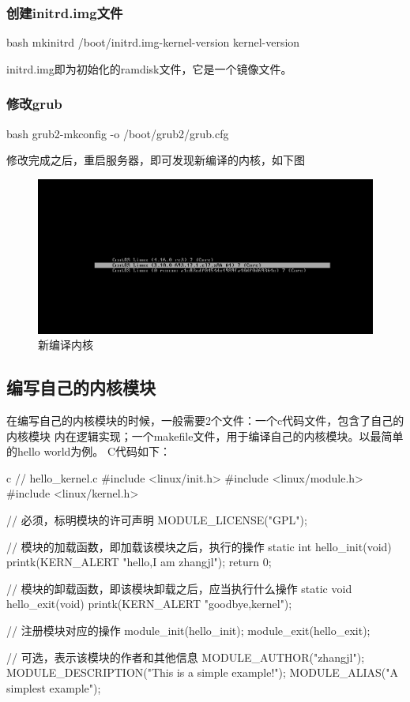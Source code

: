 \subsubsection{创建initrd.img文件}
\begin{code-block}{bash}
mkinitrd  /boot/initrd.img-{kernel-version} {kernel-version}
\end{code-block}

initrd.img即为初始化的ramdisk文件，它是一个镜像文件。

\subsubsection{修改grub}
\begin{code-block}{bash}
grub2-mkconfig -o /boot/grub2/grub.cfg
\end{code-block}

修改完成之后，重启服务器，即可发现新编译的内核，如下图
\begin{figure}[H]
  \centering
  \includegraphics[scale=0.2]{new-kernel.png}
  \caption{新编译内核}
  \label{fig:new-kernel}
\end{figure}

\subsection{编写自己的内核模块}
在编写自己的内核模块的时候，一般需要2个文件：一个c代码文件，包含了自己的内核模块
内在逻辑实现；一个makefile文件，用于编译自己的内核模块。以最简单的hello world为例。
C代码如下：
\begin{code-block}{c}
// hello_kernel.c
#include <linux/init.h>
#include <linux/module.h>
#include <linux/kernel.h>

// 必须，标明模块的许可声明
MODULE_LICENSE("GPL");

// 模块的加载函数，即加载该模块之后，执行的操作
static int hello_init(void)
{
    printk(KERN_ALERT "hello,I am zhangjl\n");
    return 0;
}

// 模块的卸载函数，即该模块卸载之后，应当执行什么操作
static void hello_exit(void)
{
    printk(KERN_ALERT "goodbye,kernel\n");
}

// 注册模块对应的操作
module_init(hello_init);
module_exit(hello_exit);

// 可选，表示该模块的作者和其他信息
MODULE_AUTHOR("zhangjl");
MODULE_DESCRIPTION("This is a simple example!\n");
MODULE_ALIAS("A simplest example");
\end{code-block}

